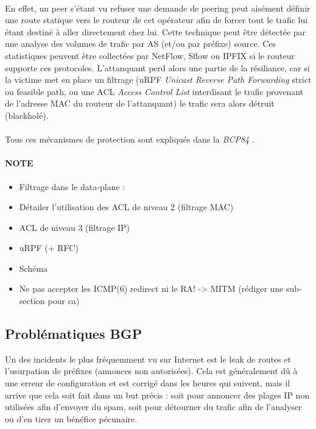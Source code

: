 \paragraph{}
En effet, un peer s'étant vu refuser une demande de peering peut aisément définir une route statique vers le routeur de cet opérateur afin de forcer tout le trafic lui étant destiné à aller directement chez lui. Cette technique peut être détectée par une analyse des volumes de trafic par AS (et/ou par préfixe) source. Ces statistiques peuvent être collectées par NetFlow, Sflow ou IPFIX si le routeur supporte ces protocoles. L'attanquant perd alors une partie de la résiliance, car si la victime met en place un filtrage (uRPF \emph{Unicast Reverse Path Forwarding} strict ou feasible path, ou une ACL \emph{Access Control List} interdisant le trafic provenant de l'adresse MAC du routeur de l'attanquant) le trafic sera alors détruit (blackholé).

\paragraph{}
Tous ces mécanismes de protection sont expliqués dans la \emph{BCP84} \cite{fenioux:BCP84}.


\paragraph{NOTE}
\begin{itemize}
\item Filtrage dans le data-plane : 
\item Détailer l'utilisation des ACL de niveau 2 (filtrage MAC)
\item ACL de niveau 3 (filtrage IP) 
\item uRPF (+ RFC)
\item Schéma
\item Ne pas accepter les ICMP(6) redirect ni le RA! -> MITM (rédiger une sub-section pour ca)
\end{itemize}


\subsection{Problématiques BGP}

Un des incidents le plus fréquemment vu sur Internet est le leak de routes et l'usurpation de préfixes (annonces non autorisées). Cela est généralement dû à une erreur de configuration et est corrigé dans les heures qui suivent, mais il arrive que cela soit fait dans un but précis : soit pour annoncer des plages IP non utilisées afin d'envoyer du spam, soit pour détourner du trafic afin de l'analyser ou d'en tirer un bénéfice pécunaire.


